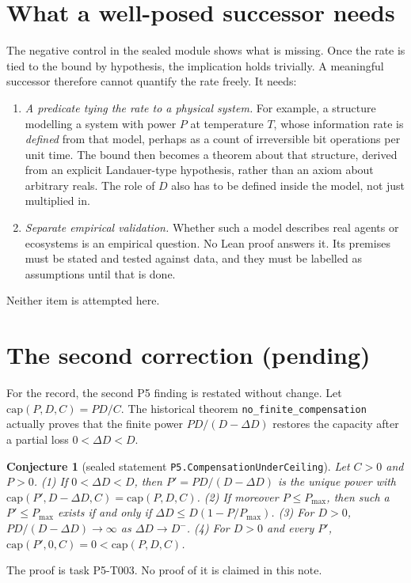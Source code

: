 \documentclass[11pt]{article}
\newtheorem{conjecture}{Conjecture}
\theoremstyle{remark}
\begin{document}
\section{What a well-posed successor needs}
The negative control in the sealed module shows what is missing. Once the rate is tied to the
bound by hypothesis, the implication holds trivially. A meaningful successor therefore cannot
quantify the rate freely. It needs:
\begin{enumerate}
\item \emph{A predicate tying the rate to a physical system.} For example, a structure modelling
  a system with power $P$ at temperature $T$, whose information rate is \emph{defined} from that
  model, perhaps as a count of irreversible bit operations per unit time. The bound then becomes a
  theorem about that structure, derived from an explicit Landauer-type hypothesis, rather than an
  axiom about arbitrary reals. The role of $D$ also has to be defined inside the model, not just
  multiplied in.
\item \emph{Separate empirical validation.} Whether such a model describes real agents or
  ecosystems is an empirical question. No Lean proof answers it. Its premises must be stated and
  tested against data, and they must be labelled as assumptions until that is done.
\end{enumerate}
Neither item is attempted here.

\section{The second correction (pending)}
For the record, the second P5 finding is restated without change. Let $\mathrm{cap}(P,D,C)=PD/C$.
The historical theorem \texttt{no\_finite\_compensation} actually proves that the finite power
$PD/(D-\Delta D)$ restores the capacity after a partial loss $0<\Delta D<D$.
\begin{conjecture}[sealed statement \texttt{P5.CompensationUnderCeiling}]
Let $C>0$ and $P>0$. (1) If $0<\Delta D<D$, then $P'=PD/(D-\Delta D)$ is the unique power with
$\mathrm{cap}(P',D-\Delta D,C)=\mathrm{cap}(P,D,C)$. (2) If moreover $P\le P_{\max}$, then such a
$P'\le P_{\max}$ exists if and only if $\Delta D\le D(1-P/P_{\max})$. (3) For $D>0$,
$PD/(D-\Delta D)\to\infty$ as $\Delta D\to D^-$. (4) For $D>0$ and every $P'$,
$\mathrm{cap}(P',0,C)=0<\mathrm{cap}(P,D,C)$.
\end{conjecture}
\noindent The proof is task P5-T003. No proof of it is claimed in this note.
\end{document}
